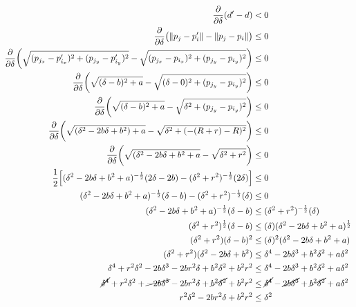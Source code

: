 \documentclass[conference]{IEEEtran}
\begin{document}
    {%
      \setlength{\belowdisplayskip}{3pt}%
      \setlength{\abovedisplayskip}{3pt}%
      \begin{align*}
        \frac{\partial}{\partial\delta}(d'-d) &< 0 \\
        \frac{\partial}{\partial\delta}\big(\lVert p_j - p'_i \rVert - \lVert p_j - p_i \rVert\big) &\leq 0 \\
        \frac{\partial}{\partial\delta}\bigg(\sqrt{(p_{j_x} - p'_{i_x})^2 + (p_{j_y} - p'_{i_y})^2} - \sqrt{(p_{j_x} - p_{i_x})^2 + (p_{j_y} - p_{i_y})^2}\bigg) &\leq 0 \\
        \frac{\partial}{\partial\delta}\bigg(\sqrt{(\delta - b)^2 + a} - \sqrt{(\delta - 0)^2 + (p_{j_y} - p_{i_y})^2}\bigg) &\leq 0 \\
        \frac{\partial}{\partial\delta}\bigg(\sqrt{(\delta - b)^2 + a} - \sqrt{\delta^2 + (p_{j_y} - p_{i_y})^2}\bigg) &\leq 0 \\
        \frac{\partial}{\partial\delta}\bigg(\sqrt{(\delta^2 -2b\delta + b^2) + a} - \sqrt{\delta^2 + (-(R+r) - R)^2}\bigg) &\leq 0 \\
        \frac{\partial}{\partial\delta}\bigg(\sqrt{(\delta^2 -2b\delta + b^2 + a} - \sqrt{\delta^2 + r^2}\bigg) &\leq 0 \\
        \frac{1}{2}\Big[(\delta^2 -2b\delta + b^2 + a)^{-\frac{1}{2}}(2\delta-2b) - (\delta^2 + r^2)^{-\frac{1}{2}}(2\delta)\Big] &\leq 0 \\
        (\delta^2 -2b\delta + b^2 + a)^{-\frac{1}{2}}(\delta-b) - (\delta^2 + r^2)^{-\frac{1}{2}}(\delta) &\leq 0 \\
        (\delta^2 -2b\delta + b^2 + a)^{-\frac{1}{2}}(\delta-b) &\leq (\delta^2 + r^2)^{-\frac{1}{2}}(\delta) \\
        (\delta^2 + r^2)^{\frac{1}{2}}(\delta-b) &\leq (\delta)(\delta^2 -2b\delta + b^2 + a)^{\frac{1}{2}} \\
        (\delta^2 + r^2)(\delta-b)^2 &\leq (\delta)^2(\delta^2 -2b\delta + b^2 + a) \\
        (\delta^2+r^2)(\delta^2-2b\delta+b^2) &\leq \delta^4-2b\delta^3+b^2\delta^2+a\delta^2 \\
        \delta^4+r^2\delta^2-2b\delta^3-2br^2\delta+b^2\delta^2+b^2r^2 &\leq \delta^4-2b\delta^3+b^2\delta^2+a\delta^2 \\
        \cancel{\delta^4}+r^2\delta^2+\cancel{-2b\delta^3}-2br^2\delta+\cancel{b^2\delta^2}+b^2r^2 &\leq \cancel{\delta^4}-\cancel{2b\delta^3}+\cancel{b^2\delta^2}+a\delta^2 \\
        r^2\delta^2-2br^2\delta+b^2r^2 &\leq \delta^2 \\

\end{align*}}
\end{document}
